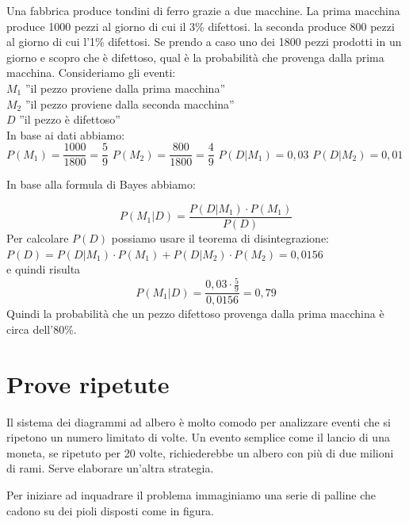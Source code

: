 \begin{esempio}
Una fabbrica produce tondini di ferro grazie a due macchine. La prima 
macchina 
produce 1000 pezzi al giorno di cui il 3\% difettosi. la seconda produce 800 
pezzi al giorno di cui l'1\% difettosi. Se prendo a caso uno dei 1800 pezzi 
prodotti in un giorno e scopro che è difettoso, qual è la probabilità che 
provenga dalla prima macchina.
Consideriamo gli eventi:\\
$M_1$ ''il pezzo proviene dalla prima macchina''\\
$M_2$ ''il pezzo proviene dalla seconda macchina''\\
$D$ ''il pezzo è difettoso''\\
In base ai dati abbiamo:\\
$P(M_1)=\dfrac{1000}{1800}=\dfrac{5}{9}$
$P(M_2)=\dfrac{800}{1800}=\dfrac{4}{9}$
$P(D|M_1)=0,03$
$P(D|M_2)=0,01$
\end{esempio}

In base alla formula di Bayes abbiamo:

$$P(M_1|D)=\dfrac{P(D|M_1)\cdot P(M_1)}{P(D)}$$
Per calcolare $P(D)$ possiamo usare il teorema di disintegrazione:\\
$P(D)=P(D|M_1)\cdot P(M_1) + P(D|M_2)\cdot P(M_2)=0,0156$\\
e quindi risulta 
$$P(M_1|D)=\dfrac{0,03 \cdot \frac{5}{9}}{0,0156}=0,79$$
Quindi la probabilità che un pezzo difettoso provenga dalla prima macchina è 
circa dell'80\%.


\section{Prove ripetute}

Il sistema dei diagrammi ad albero è molto comodo per analizzare eventi che 
si ripetono un numero limitato di volte. Un evento semplice come il lancio di 
una moneta, se ripetuto per 20 volte, richiederebbe un albero con più di due 
milioni di rami. Serve elaborare un'altra strategia. 

Per iniziare ad inquadrare il problema immaginiamo una serie di palline che 
cadono su dei pioli disposti come in figura. 

